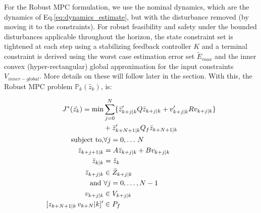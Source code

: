 For the Robust MPC formulation, we use the nominal dynamics, which are the dynamics of Eq.\ref{eq:dynamics_estimate}, but with the disturbance removed (by moving it to the constraints). For robust feasibility and safety under the bounded disturbances applicable throughout the horizon, the state constraint set is tightened at each step using a stabilizing feedback controller $K$ and a terminal constraint is derived using the worst case estimation error set $\tilde{E}_{max}$ and the inner convex (hyper-rectangular) global approximation for the input constraints $V_{inner-global}$. More details on these will follow later in the section.
With this, the Robust MPC problem $\mathbb{P}_k(\hat{z}_k)$, is:

\begin{subequations} \label{eq:RMPC}
	\label{eq:linear mpc}
\begin{align}
J^{*}(\hat{z_k}) = \text{min} &\sum_{j=0}^{N}\lbrace\bar{z}_{k+j|k}'Q\bar{z}_{k+j|k} + {v}_{k+j|k}'R{v}_{k+j|k}\rbrace \nonumber \\ 
&+ \bar{z}_{k+N+1|k}'Q_f\bar{z}_{k+N+1|k} \label{eq:cost} \\
\text{subject to,} &\forall j=0,\dotsc\,N \nonumber \\
\bar{z}_{k+j+1|k}&=A\bar{z}_{k+j|k} + Bv_{k+j|k} \label{eq:nom_dyn} \\
\bar{z}_{k|k} &= \hat{z}_{k} \label{eq:init_cond}\\
\bar{z}_{k+j|k}& \in \bar{Z}_{k+j|k} \label{eq:states_con}\\
\text{and } &\forall j=0,\dotsc,N-1 \nonumber \\
v_{k+j|k} & \in V_{k+j|k} \label{eq:input_con} \\
[z_{k+N+1|k} \, v_{k+N}|k]' & \in P_f \label{eq:joint_term} 
\end{align}
\end{subequations}

